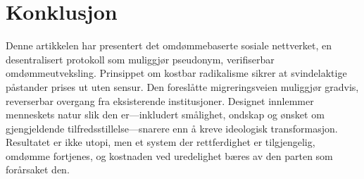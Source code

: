 \documentclass[11pt,a4paper,twocolumn]{article}
\begin{document}
\section{Konklusjon}

Denne artikkelen har presentert det omdømmebaserte sosiale nettverket, en desentralisert protokoll som muliggjør pseudonym, verifiserbar omdømmeutveksling. Prinsippet om kostbar radikalisme sikrer at svindelaktige påstander prises ut uten sensur. Den foreslåtte migreringsveien muliggjør gradvis, reverserbar overgang fra eksisterende institusjoner. Designet innlemmer menneskets natur slik den er---inkludert smålighet, ondskap og ønsket om gjengjeldende tilfredsstillelse---snarere enn å kreve ideologisk transformasjon. Resultatet er ikke utopi, men et system der rettferdighet er tilgjengelig, omdømme fortjenes, og kostnaden ved uredelighet bæres av den parten som forårsaket den.


\end{document}
